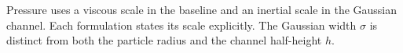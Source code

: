 \documentclass[12pt,a4paper,oneside]{report}
\begin{document}
\noindent Pressure uses a viscous scale in the baseline and an inertial scale
in the Gaussian channel. Each formulation states its scale explicitly.
The Gaussian width $\sigma$ is distinct from both the particle radius and
the channel half-height $h$.
\endgroup
\clearpage{}









\appendix


\end{document}
